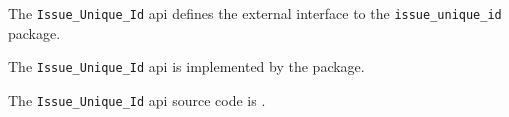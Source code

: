 
The {\tt Issue\_Unique\_Id} api defines the external interface to the {\tt issue\_unique\_id} package.

The {\tt Issue\_Unique\_Id} api is implemented by the  package.

The {\tt Issue\_Unique\_Id} api source code is .

